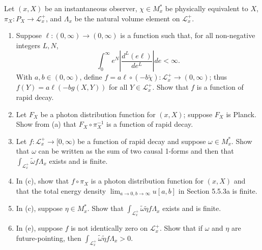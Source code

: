 Let $(x, X)$ be an instantaneous observer, $\chi \in M_x^*$ be physically equivalent to $X$, $\pi_X: P_X \to \mathcal{L}_x^+$, and $\Lambda_x$ be the natural volume element on $\mathcal{L}_x^+$.

\begin{enumerate}
    \item[(a)] Suppose $\ell: (0, \infty) \to (0, \infty)$ is a function such that, for all non-negative integers $L, N$,
    $$\int_0^\infty e^N \left|\frac{d^L(e\ell)}{de^L}\right| de < \infty.$$
    With $a, b \in (0, \infty)$, define $f = a\ell \circ (-b\tilde{\chi}): \mathcal{L}_x^+ \to (0, \infty)$; thus $f(Y) = a\ell(-b g(X, Y))$ for all $Y \in \mathcal{L}_x^+$. Show that $f$ is a function of rapid decay.

    \item[(b)] Let $F_X$ be a photon distribution function for $(x, X)$; suppose $F_X$ is Planck. Show from (a) that $F_X \circ \pi_X^{-1}$ is a function of rapid decay.

    \item[(c)] Let $f: \mathcal{L}_x^+ \to [0, \infty)$ be a function of rapid decay and suppose $\omega \in M_x^*$. Show that $\omega$ can be written as the sum of two causal 1-forms and then that $\int_{\mathcal{L}_x^+} \tilde{\omega} f \Lambda_x$ exists and is finite.

    \item[(d)] In (c), show that $f \circ \pi_X$ is a photon distribution function for $(x, X)$ and that the total energy density $\lim_{a \to 0, b \to \infty} u[a, b]$ in Section 5.5.3a is finite.

    \item[(e)] In (c), suppose $\eta \in M_x^*$. Show that $\int_{\mathcal{L}_x^+} \tilde{\omega} \tilde{\eta} f \Lambda_x$ exists and is finite.

    \item[(f)] In (e), suppose $f$ is not identically zero on $\mathcal{L}_x^+$. Show that if $\omega$ and $\eta$ are future-pointing, then $\int_{\mathcal{L}_x^+} \tilde{\omega} \tilde{\eta} f \Lambda_x > 0$.
\end{enumerate}
